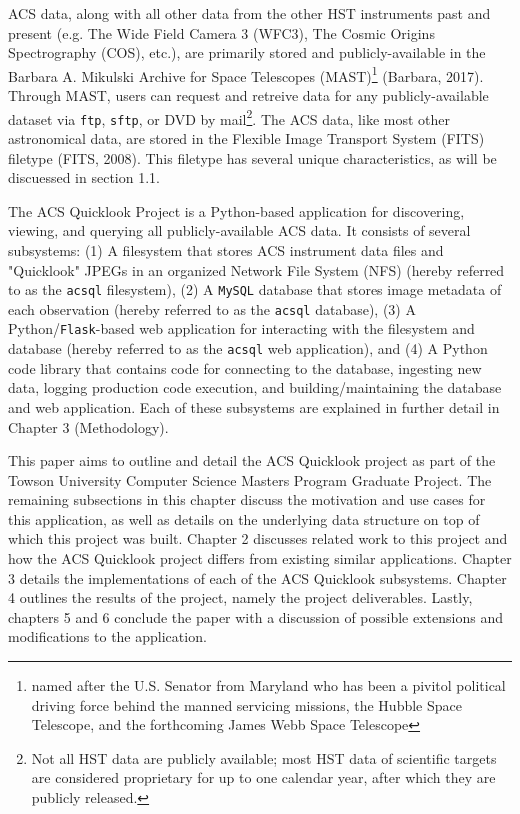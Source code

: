 \documentclass[10pt,journal,compsoc]{IEEEtran}
\begin{document}
ACS data, along with all other data from the other HST instruments past and present
(e.g. The Wide Field Camera 3 (WFC3), The Cosmic Origins Spectrography (COS), etc.),
are primarily stored and publicly-available in the Barbara A. Mikulski Archive for
Space Telescopes (MAST)\footnote{named after the U.S. Senator from Maryland who has
been a pivitol political driving force behind the manned servicing missions, the
Hubble Space Telescope, and the forthcoming James Webb Space Telescope} (Barbara, 2017).
Through MAST, users can request and retreive data for any publicly-available dataset
via \texttt{ftp}, \texttt{sftp}, or DVD by mail\footnote{Not all HST data are publicly
available; most HST data of scientific targets are considered proprietary for up to
one calendar year, after which they are publicly released.}.  The ACS data, like most other
astronomical data, are stored in the Flexible Image Transport System (FITS) filetype
(FITS, 2008).  This filetype has several unique characteristics, as will be
discuessed in section 1.1.

The ACS Quicklook Project is a Python-based application for discovering,
viewing, and querying all publicly-available ACS data.  It consists of several subsystems:
(1) A filesystem that stores ACS instrument data files and "Quicklook" JPEGs in an
organized Network File System (NFS) (hereby referred to as the \texttt{acsql} filesystem),
(2) A \texttt{MySQL} database that stores image metadata of each observation (hereby referred to
as the \texttt{acsql} database), (3) A Python/\texttt{Flask}-based web application
for interacting with the filesystem and database (hereby referred to as the \texttt{acsql} web
application), and (4) A Python code library that contains code for connecting to the database,
ingesting new data, logging production code execution, and building/maintaining the database
and web application.  Each of these subsystems are explained in further detail in Chapter 3
(Methodology).

This paper aims to outline and detail the ACS Quicklook project as part of the Towson
University Computer Science Masters Program Graduate Project.  The remaining subsections
in this chapter discuss the motivation and use cases for this application, as well as
details on the underlying data structure on top of which this project was built.  Chapter
2 discusses related work to this project and how the ACS Quicklook project differs from
existing similar applications.  Chapter 3 details the implementations of each of the
ACS Quicklook subsystems.  Chapter 4 outlines the results of the project, namely the
project deliverables.  Lastly, chapters 5 and 6 conclude the paper with a discussion
of possible extensions and modifications to the application.
\end{document}

